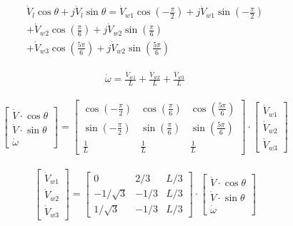 \begin{align*}
    \dot{V}_{l} \cos{ \theta } + j\dot{V}_{l} \sin{\theta} =  
    \dot{V}_{w1} \cos{ \left(-\frac{\pi}{2}\right)} + j\dot{V}_{w1} \sin{ \left(-\frac{\pi}{2}\right) } \\
    + \dot{V}_{w2}  \cos{ \left(\frac{\pi}{6}\right) } + j\dot{V}_{w2}  \sin{ \left(\frac{\pi}{6}\right) }  \\
    + \dot{V}_{w3} \cos{ \left(\frac{5\pi}{6}\right) } + j\dot{V}_{w2}  \sin{ \left(\frac{5\pi}{6}\right) } 
\end{align*}

\begin{equation*}
    \begin{split}
        \dot{\omega} = 
        \frac{\dot{V}_{w1}}{L}
        + \frac{\dot{V}_{w2}}{L}
        + \frac{\dot{V}_{w3}}{L}
    \end{split}
\end{equation*}


\begin{gather}
	\begin{bmatrix} \dot{V}\cdot \cos{\theta} \\  \dot{V}\cdot \sin{\theta} \\  \dot{\omega} \end{bmatrix}
	=
	\begin{bmatrix}
		\cos{\left(-\frac{\pi}{2}\right)} & \cos{\left(\frac{\pi}{6}\right)} & \cos{\left(\frac{5\pi}{6}\right)} \\
		\sin{\left(-\frac{\pi}{2}\right)} & \sin{\left(\frac{\pi}{6}\right)} & \sin{\left(\frac{5\pi}{6}\right)} \\
		\frac{1}{L} & \frac{1}{L} & \frac{1}{L}
	\end{bmatrix}
	\cdot
	\begin{bmatrix} \dot{V}_{w1} \\  \dot{V}_{w2} \\  \dot{V}_{w3} \end{bmatrix}
\end{gather}



\begin{gather}
	\begin{bmatrix} \dot{V}_{w1} \\  \dot{V}_{w2} \\  \dot{V}_{w3} \end{bmatrix}
	=
	\begin{bmatrix}
		0 & 2/3 & L/3 \\
		-1/\sqrt{3} & -1/3 & L/3\\
		1/\sqrt{3} & -1/3 & L/3
	\end{bmatrix}
	\cdot
	\begin{bmatrix} \dot{V}\cdot \cos{\theta} \\  \dot{V}\cdot \sin{\theta} \\  \dot{\omega} \end{bmatrix}
\end{gather}
